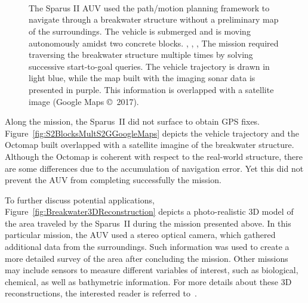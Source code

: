 \begin{figure}[htbp]
\myfloatalign
	\\%
	\quad
    \\%
	\quad
    \\%
\caption[The Sparus II AUV using the path/motion planning framework to navigate
through a breakwater structure without a preliminary map of the surroundings.]
{The Sparus II \ac{AUV} used the path/motion planning
framework to navigate through a breakwater structure without a preliminary
map of the surroundings.
\protect {} The vehicle is submerged
and is moving autonomously amidst two concrete blocks.
\protect {}, \protect
{}, \protect {},
\protect {} The mission required traversing the
breakwater structure multiple times by solving successive start-to-goal
queries.
\protect {} The vehicle trajectory is drawn
in light blue, while the map built with the imaging sonar data is presented in
purple. This information is overlapped with a satellite image (Google Maps
\copyright~2017).}
\label{fig:S2ConcrBlocksMultS2G}
\end{figure}

Along the mission, the Sparus~II did not surface to obtain GPS fixes.
Figure~\ref{fig:S2BlocksMultS2GGoogleMaps} depicts the vehicle trajectory and
the Octomap built overlapped with a satellite imagine of the breakwater structure.
Although the Octomap is coherent with respect to the real-world structure, there
are some differences due to the accumulation of navigation error. Yet this did
not prevent the \ac{AUV} from completing successfully the mission.

To further discuss potential applications,
Figure~\ref{fig:Breakwater3DReconstruction} depicts a photo-realistic \ac{3D}
model of the area traveled by the Sparus~II during the mission presented above.
In this particular mission, the \ac{AUV} used a stereo optical camera, which
gathered additional data from the surroundings. Such information was used to
create a more detailed survey of the area after concluding the mission. Other
missions may include sensors to measure different variables of interest, such as
biological, chemical, as well as bathymetric information. For more details about
these \ac{3D} reconstructions, the interested reader is referred
to~\cite{Hernandez2016,Hernandez2016a}.

